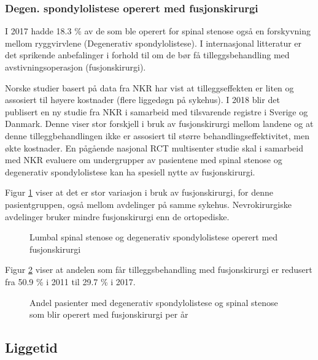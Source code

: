 \documentclass [norsk,a4paper,twoside]{article}\usepackage[]{graphicx}\usepackage[]{color}
\begin{document}
\subsubsection{Degen. spondylolistese operert med fusjonskirurgi}


I 2017 hadde 18.3 \% av de som ble operert for spinal stenose  også en forskyvning mellom ryggvirvlene (Degenerativ spondylolistese). I internasjonal litteratur er det sprikende anbefalinger i forhold til om de bør få tilleggsbehandling med avstivningsoperasjon (fusjonskirurgi).
 

Norske studier basert på data fra NKR har vist at tilleggseffekten er liten og assosiert til høyere kostnader (flere liggedøgn på sykehus). 
I 2018 blir det publisert en ny studie fra NKR i samarbeid med  tilsvarende registre i Sverige og Danmark. Denne viser stor forskjell i bruk av fusjonskirurgi mellom landene og at denne tilleggbehandlingen ikke er assosiert til større behandlingseffektivitet, men økte kostnader. En pågående nasjonal RCT multisenter studie skal i samarbeid med NKR evaluere om undergrupper av pasientene med spinal stenose og degenerativ spondylolistese kan ha spesiell nytte av fusjonskirurgi.
\clearpage

Figur \ref{fig:degSponFusj} viser at det er stor variasjon i bruk av fusjonskirurgi, 
for denne pasientgruppen, også mellom avdelinger på samme sykehus. Nevrokirurgiske avdelinger bruker mindre fusjonskirurgi enn de ortopediske.
\begin{figure}[ht]
\caption{\label{fig:degSponFusj} Lumbal spinal stenose og degenerativ spondylolistese operert med fusjonskirurgi}
\end{figure}

Figur \ref{fig:degSponFusjSStid} viser at andelen som får 
tilleggsbehandling med fusjonskirurgi er redusert fra 50.9 \% 
i 2011 til 29.7 \% i 2017.

\begin{figure}[ht]
\caption{\label{fig:degSponFusjSStid} Andel pasienter med degenerativ spondylolistese og spinal stenose som blir operert med fusjonskirurgi per år}
\end{figure}



\clearpage


\subsection{Liggetid}
\end{document}
